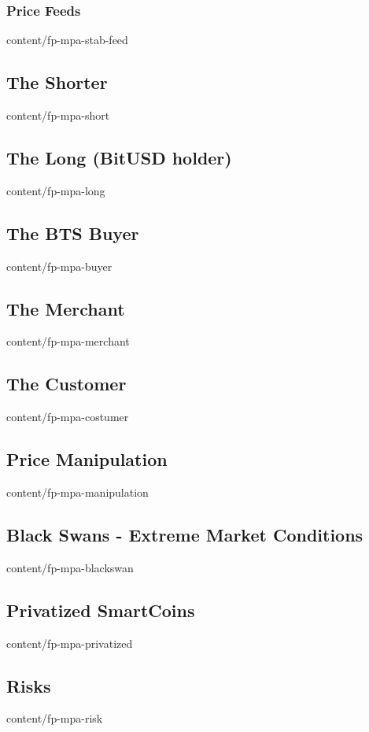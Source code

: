 \documentclass[conference,final,10pt,a4paper]{IEEEtran}
\begin{document}
\subsubsection { Price Feeds                                     }  { content/fp-mpa-stab-feed       }
\subsection    { The Shorter                                     }  { content/fp-mpa-short           } 
\subsection    { The Long (BitUSD holder)                        }  { content/fp-mpa-long            } 
\subsection    { The BTS Buyer                                   }  { content/fp-mpa-buyer           } 
\subsection    { The Merchant                                    }  { content/fp-mpa-merchant        } 
\subsection    { The Customer                                    }  { content/fp-mpa-costumer        } 
\subsection    { Price Manipulation                              }  { content/fp-mpa-manipulation    } 
\subsection    { Black Swans - Extreme Market Conditions         }  { content/fp-mpa-blackswan       } 
\subsection    { Privatized SmartCoins                           }  { content/fp-mpa-privatized      } 
\subsection    { Risks                                           }  { content/fp-mpa-risk            } 
\end{document}
